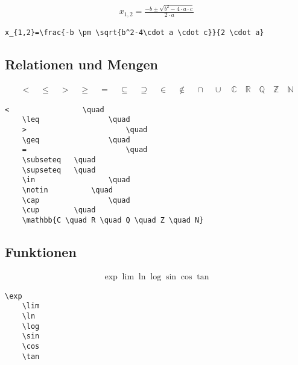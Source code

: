\begin{align}%
x_{1,2}=\frac{-b \pm \sqrt{b^2-4\cdot a \cdot c}}{2 \cdot a}
\end{align}

\lstset{language=[LaTeX]TeX } %
\begin{lstlisting}[gobble=2, frame=none, numbers=none, backgroundcolor=\color{white},%
	caption={},label={code:}]
	x_{1,2}=\frac{-b \pm \sqrt{b^2-4\cdot a \cdot c}}{2 \cdot a}
\end{lstlisting}


\subsection{Relationen und Mengen}\label{RelationenMengen }

\begin{align}
<			      \quad
\leq 				\quad
>						\quad
\geq 				\quad
=						\quad
\subseteq 	\quad
\supseteq 	\quad
\in 				\quad
\notin 			\quad
\cap 				\quad
\cup        \quad
\mathbb{C \quad R \quad Q \quad Z \quad N}
\end{align}

\lstset{language=[LaTeX]TeX } %
\begin{lstlisting}[gobble=2, frame=none, numbers=none, backgroundcolor=\color{white},%
	caption={},label={code:}]
	<			      \quad
	\leq 				\quad
	>						\quad
	\geq 				\quad
	=						\quad
	\subseteq 	\quad
	\supseteq 	\quad
	\in 				\quad
	\notin 			\quad
	\cap 				\quad
	\cup        \quad
	\mathbb{C \quad R \quad Q \quad Z \quad N}
\end{lstlisting}


\subsection{Funktionen}\label{funktionen }

\begin{align}
\exp
\lim
\ln
\log
\sin
\cos
\tan
\end{align}

\lstset{language=[LaTeX]TeX } %
\begin{lstlisting}[gobble=2, frame=none, numbers=none, backgroundcolor=\color{white},%
	caption={},label={code:}]
	\exp
	\lim
	\ln
	\log
	\sin
	\cos
	\tan
\end{lstlisting}


